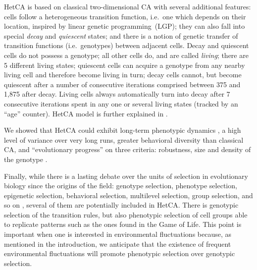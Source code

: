 HetCA \citep{medernach2013long} is based on classical two-dimensional CA with several additional features: cells follow a heterogeneous transition function, i.e.~one which depends on their location, inspired by linear genetic programming~(LGP); they can also fall into special \emph{decay} and \emph{quiescent} states; and there is a notion of genetic transfer of transition functions (i.e.~genotypes) between adjacent cells. Decay and quiescent cells do not possess a genotype; all other cells do, and are called \emph{living}; there are 5 different living states; quiescent cells can acquire a genotype from any nearby living cell and therefore become living in turn; decay cells cannot, but become quiescent after a number of consecutive iterations comprised between 375 and 1,875 after decay. Living cells always automatically turn into decay after 7 consecutive iterations spent in any one or several living states (tracked by an ``age'' counter). HetCA model is further explained in \citep{medernach2013long}.

We showed that HetCA could exhibit long-term phenotypic dynamics \citep{medernach2013long}, a high level of variance over very long runs, greater behavioral diversity than classical CA, and ``evolutionary progress'' \cite{shanahan2012evolutionary} on three criteria: robustness, size and density of the genotype \citep{medernach2015evolutionary}.

Finally, while there is a lasting debate over the units of selection in evolutionary biology since the origins of the field: genotype selection, phenotype selection, epigenetic selection, behavioral selection, multilevel selection, group selection, and so on \citep{lloyd2012unitsandlevelsofselection,okasha2006evolution}, several of them are potentially included in HetCA. There is genotypic selection of the transition rules, but also phenotypic selection of cell groups able to replicate patterns such as the ones found in the Game of Life. This point is important when one is interested in environmental fluctuations because, as mentioned in the introduction, we anticipate that the existence of frequent environmental fluctuations will promote phenotypic selection over genotypic selection.